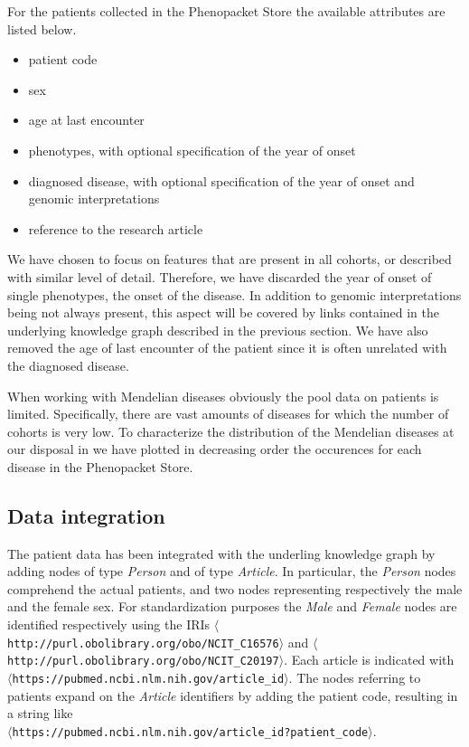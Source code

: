 For the patients collected in the Phenopacket Store the available attributes are listed below.
\begin{itemize}
  \item patient code
  \item sex
  \item age at last encounter
  \item phenotypes, with optional specification of the year of onset
  \item diagnosed disease, with optional specification of the year of onset and genomic interpretations
  \item reference to the research article
\end{itemize}

We have chosen to focus on features that are present in all cohorts, or described with similar level of detail. Therefore, we have discarded the year of onset of single phenotypes, the onset of the disease. In addition to genomic interpretations being not always present, this aspect will be covered by links contained in the underlying knowledge graph described in the previous section. We have also removed the age of last encounter of the patient since it is often unrelated with the diagnosed disease.

When working with Mendelian diseases obviously the pool data on patients is limited. Specifically, there are vast amounts of diseases for which the number of cohorts is very low. To characterize the distribution of the Mendelian diseases at our disposal in  we have plotted in decreasing order the occurences for each disease in the Phenopacket Store.



\subsection{Data integration}
The patient data has been integrated with the underling knowledge graph by adding nodes of type \emph{Person} and of type \emph{Article}. In particular, the \emph{Person} nodes comprehend the actual patients, and two nodes representing respectively the male and the female sex. For standardization purposes the \emph{Male} and \emph{Female} nodes are identified respectively using the IRIs \texttt{$\langle$http://purl.obolibrary.org/obo/NCIT\_C16576$\rangle$} and \texttt{$\langle$http://purl.obolibrary.org/obo/NCIT\_C20197$\rangle$}. Each article is indicated with \\ \texttt{$\langle$https://pubmed.ncbi.nlm.nih.gov/{article\_id}$\rangle$}. The nodes referring to patients expand on the \emph{Article} identifiers by adding the patient code, resulting in a string like \\ \texttt{$\langle$https://pubmed.ncbi.nlm.nih.gov/{article\_id}?{patient\_code}$\rangle$}. 

